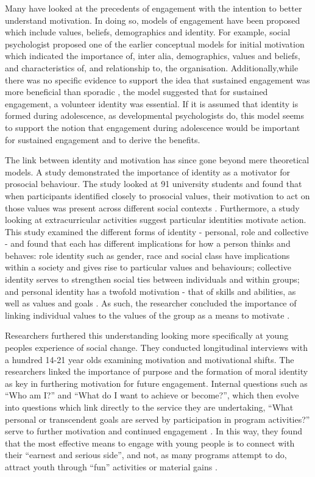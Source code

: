 Many have looked at the precedents of engagement with the intention to better understand motivation. In doing so, models of engagement have been proposed which include values, beliefs, demographics and identity. For example, social psychologist \citet{Penner2002} proposed one of the earlier conceptual models for initial motivation which indicated the importance of, inter alia,  demographics, values and beliefs, and characteristics of, and relationship to, the organisation. Additionally,while there was no specific evidence to support the idea that sustained engagement was more beneficial than sporadic  \citep[c.f.][]{Penner2002,Musick2003}, the model suggested that for sustained engagement, a volunteer identity was essential. If it is assumed that identity is formed during adolescence, as developmental psychologists do, this model seems to support the notion that engagement during adolescence would be important for sustained engagement and to derive the benefits.  

The link between identity and motivation has since gone beyond mere theoretical models. A  \citeyear{Hardy2006} study demonstrated the importance of identity as a motivator for prosocial behaviour. The study looked at 91 university students and found that when participants identified closely to prosocial values, their motivation to act on those values was present across different social contexts \citep{Hardy2006}. Furthermore, a study looking at extracurricular activities suggest particular identities motivate action. This study examined the different forms of identity - personal, role and collective - and found that each has different implications for how a person thinks and behaves: role identity such as gender, race and social class have implications within a society and gives rise to particular values and behaviours; collective identity serves to strengthen social ties between individuals and within groups; and personal identity has a twofold motivation - that of skills and abilities, as well as values and goals \citep{Eccles2009}. As such, the researcher concluded the importance of linking individual values to the values of the group as a means to motivate \citep{Eccles2009}.

Researchers \citet{Dawes2011} furthered this understanding looking more specifically at young peoples experience of social change. They conducted longitudinal interviews with a hundred 14-21 year olds examining motivation and motivational shifts. The researchers linked the importance of purpose and the formation of moral identity as key in furthering motivation for future engagement. Internal questions such as “Who am I?” and “What do I want to achieve or become?”, which then evolve into questions which link directly to the service they are undertaking, “What personal or transcendent goals are served by participation in program activities?” serve to further motivation and continued engagement \citep[][p266]{Dawes2011}. In this way, they found that the most effective means to engage with young people is to connect with their “earnest and serious side”, and not, as many programs attempt to do, attract youth through “fun” activities or material gains \citep[][p266]{Dawes2011}.




